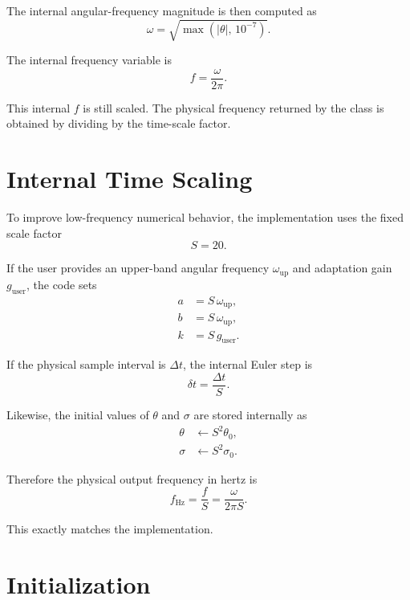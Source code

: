 \documentclass[conference]{IEEEtran}
\begin{document}
The internal angular-frequency magnitude is then computed as
\begin{equation}
  \omega = \sqrt{\max\!\left(|\theta|,\,10^{-7}\right)}.
\end{equation}

The internal frequency variable is
\begin{equation}
  f = \frac{\omega}{2\pi}.
\end{equation}

This internal $f$ is still scaled. The physical frequency returned by the
class is obtained by dividing by the time-scale factor.

\section{Internal Time Scaling}

To improve low-frequency numerical behavior, the implementation uses the fixed
scale factor
\begin{equation}
  S = 20.
\end{equation}

If the user provides an upper-band angular frequency $\omega_{\text{up}}$
and adaptation gain $g_{\text{user}}$, the code sets
\begin{align}
  a &= S\,\omega_{\text{up}},\\
  b &= S\,\omega_{\text{up}},\\
  k &= S\,g_{\text{user}}.
\end{align}

If the physical sample interval is $\Delta t$, the internal Euler step is
\begin{equation}
  \delta t = \frac{\Delta t}{S}.
\end{equation}

Likewise, the initial values of $\theta$ and $\sigma$ are stored internally as
\begin{align}
  \theta &\leftarrow S^2 \theta_0,\\
  \sigma &\leftarrow S^2 \sigma_0.
\end{align}

Therefore the physical output frequency in hertz is
\begin{equation}
  f_{\text{Hz}} = \frac{f}{S}
  = \frac{\omega}{2\pi S}.
\end{equation}

This exactly matches the implementation.

\section{Initialization}
\end{document}
